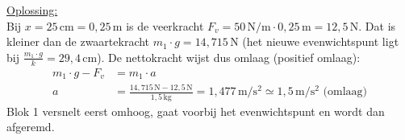 \documentclass{ximera}
\begin{document}
\begin{exercise}
\begin{question}
\begin{solution}
            \underline{Oplossing:}\\
            Bij $x = 25 \, \mathrm{cm} = 0{,}25 \, \mathrm{m}$ is de veerkracht $F_{v} = 50 \, \mathrm{N/m} \cdot 0{,}25 \, \mathrm{m} = 12{,}5 \, \mathrm{N}$. Dat is kleiner dan de zwaartekracht $m_{1} \cdot g = 14{,}715 \, \mathrm{N}$ (het nieuwe evenwichtspunt ligt bij $\frac{m_{1} \cdot g}{k} = 29{,}4 \, \mathrm{cm}$). De nettokracht wijst dus omlaag (positief omlaag):
            \begin{align*}
                m_{1} \cdot g - F_{v} &= m_{1} \cdot a \\
                a &= \frac{14{,}715 \, \mathrm{N} - 12{,}5 \, \mathrm{N}}{1{,}5 \, \mathrm{kg}} = 1{,}477 \, \mathrm{m/s^2} \simeq 1{,}5 \, \mathrm{m/s^2} \text{ (omlaag)}
            \end{align*}
            Blok 1 versnelt eerst omhoog, gaat voorbij het evenwichtspunt en wordt dan afgeremd.
        \end{solution}
    \end{question}
\end{exercise}
\end{document}
